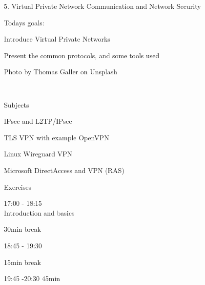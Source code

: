 \documentclass[Screen16to9,17pt]{foils}
\begin{document}
\mytitlepage
{5. Virtual Private Network}
{Communication and Network Security \the\year}




Todays goals:
\begin{list2}
\item Introduce Virtual Private Networks
\item Present the common protocols, and some tools used
\end{list2}

{\small \hfill Photo by Thomas Galler on Unsplash}





{~}

\begin{list1}
\item Subjects
\begin{list2}
\item IPsec and L2TP/IPsec
\item TLS VPN with example OpenVPN
\item Linux Wireguard VPN
\item Microsoft DirectAccess and VPN (RAS)
\end{list2}
\item Exercises
\begin{list2}
\item
\end{list2}
\end{list1}




\begin{list2}
\item 17:00 - 18:15\\
Introduction and basics
\item 30min break\\

\item 18:45 - 19:30\\

\item 15min break\\

\item 19:45 -20:30 45min\\
\end{list2}
\end{document}
